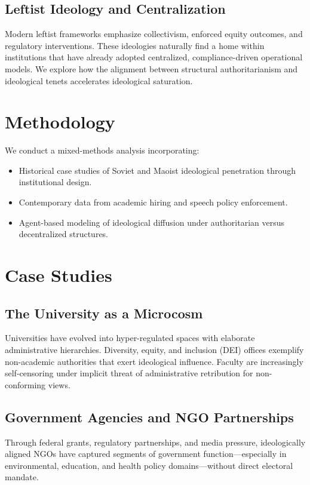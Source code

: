 \documentclass[11pt]{article}
\begin{document}
\subsection{Leftist Ideology and Centralization}

Modern leftist frameworks emphasize collectivism, enforced equity outcomes, and regulatory interventions. These ideologies naturally find a home within institutions that have already adopted centralized, compliance-driven operational models. We explore how the alignment between structural authoritarianism and ideological tenets accelerates ideological saturation.

\section{Methodology}

We conduct a mixed-methods analysis incorporating:
\begin{itemize}
    \item Historical case studies of Soviet and Maoist ideological penetration through institutional design.
    \item Contemporary data from academic hiring and speech policy enforcement.
    \item Agent-based modeling of ideological diffusion under authoritarian versus decentralized structures.
\end{itemize}

\section{Case Studies}

\subsection{The University as a Microcosm}

Universities have evolved into hyper-regulated spaces with elaborate administrative hierarchies. Diversity, equity, and inclusion (DEI) offices exemplify non-academic authorities that exert ideological influence. Faculty are increasingly self-censoring under implicit threat of administrative retribution for non-conforming views.

\subsection{Government Agencies and NGO Partnerships}

Through federal grants, regulatory partnerships, and media pressure, ideologically aligned NGOs have captured segments of government function—especially in environmental, education, and health policy domains—without direct electoral mandate.
\end{document}
